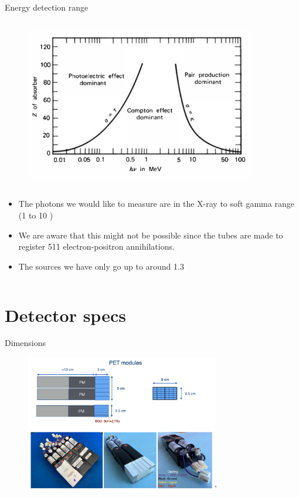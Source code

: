 \begin{columnframe}{Energy detection range}
    \begin{column}{0.5\textwidth}
        \begin{figure}
            \centering
            \includegraphics[width=0.9\textwidth]{images/effect_dominance_knoll.png}
        \end{figure}
    \end{column}
    \begin{column}{0.5\textwidth}
        \begin{itemize}
            \item The photons we would like to measure are in the X-ray to soft gamma range (1 \keV to 10 \MeV)
            \item We are aware that this might not be possible since the tubes are made to register 511 \keV electron-positron annihilations.
            \item The sources we have only go up to around 1.3 \MeV
        \end{itemize}
    \end{column}
\end{columnframe}

\section{Detector specs}

\begin{frame}{Dimensions}
    \begin{figure}
        \centering
        \includegraphics[width=0.75\textwidth]{images/bgo_dimensions.png}'
    \end{figure}
\end{frame}

